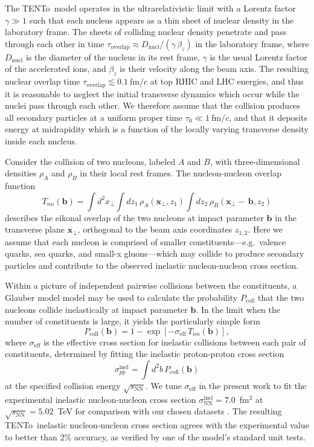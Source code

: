 \documentclass[aps,prc,reprint,amsmath,nofootinbib]{revtex4-1}
\newcommand{\trento}{T\raisebox{-0.5ex}{R}ENTo}
\newcommand{\sqrts}{\sqrt{s_\mathrm{NN}}}
\newcommand{\fmc}{\ensuremath{\text{fm}/c}}
\newcommand{\bv}{\mathbf b}
\newcommand{\xv}{\mathbf x}
\begin{document}
The \trento\ model operates in the ultrarelativistic limit with a Lorentz factor $\gamma \gg 1$ such that each nucleus appears as a thin sheet of nuclear density in the laboratory frame.
The sheets of colliding nuclear density penetrate and pass through each other in time $\tau_\text{overlap} \approx D_\text{nucl} / (\gamma\, \beta_z)$ in the laboratory frame, where $D_\text{nucl}$ is the diameter of the nucleus in its rest frame, $\gamma$ is the usual Lorentz factor of the accelerated ions, and $\beta_z$ is their velocity along the beam axis.
The resulting nuclear overlap time $\tau_\text{overlap} \lesssim 0.1\ \fmc$ at top RHIC and LHC energies, and thus it is reasonable to neglect the initial transverse dynamics which occur while the nuclei pass through each other.
We therefore assume that the collision produces all secondary particles at a uniform proper time $\tau_0 \ll 1~\fmc$, and that it deposits energy at midrapidity which is a function of the locally varying transverse density inside each nucleus.

Consider the collision of two nucleons, labeled $A$ and $B$, with three-dimensional densities $\rho_A$ and $\rho_B$ in their local rest frames.
The nucleon-nucleon overlap function
\begin{equation}
  \label{eq:tpp}
  T_{nn}(\bv) = \int d^2x_\perp \int dz_1\, \rho_A(\xv_\perp, z_1) \int dz_2\, \rho_B(\xv_\perp - \,\bv, z_2)
\end{equation}
describes the eikonal overlap of the two nucleons at impact parameter $\bv$ in the transverse plane $\xv_\perp$, orthogonal to the beam axis coordinates $z_{1,2}$.
Here we assume that each nucleon is comprised of smaller constituents---e.g.\ valence quarks, sea quarks, and small-x gluons---which may collide to produce secondary particles and contribute to the observed inelastic nucleon-nucleon cross section.

Within a picture of independent pairwise collisions between the constituents, a Glauber model model may be used to calculate the probability $P_\mathrm{coll}$ that the two nucleons collide inelastically at impact parameter $\bv$.
In the limit when the number of constituents is large, it yields the particularly simple form
\begin{equation}
  \label{eq:pcoll}
  P_\mathrm{coll}(\bv) = 1 - \exp[-\sigma_\mathrm{eff}\, T_{nn}(\bv)],
\end{equation}
where $\sigma_\mathrm{eff}$ is the effective cross section for inelastic collisions between each pair of constituents, determined by fitting the inelastic proton-proton cross section
\begin{equation}
  \label{eq:sigma_nn}
  \sigma_{pp}^\mathrm{inel} = \int d^2b\, P_\mathrm{coll}(\bv)
\end{equation}
at the specified collision energy $\sqrts$.
We tune $\sigma_\mathrm{eff}$ in the present work to fit the experimental inelastic nucleon-nucleon cross section $\sigma_\text{NN}^\text{inel}= 7.0$~fm$^2$ at $\sqrts=5.02$~TeV for comparison with our chosen datasets \cite{ALICE:2012xs}.
The resulting \trento\ inelastic nucleon-nucleon cross section agrees with the experimental value to better than 2\% accuracy, as verified by one of the model's standard unit tests.
\end{document}
